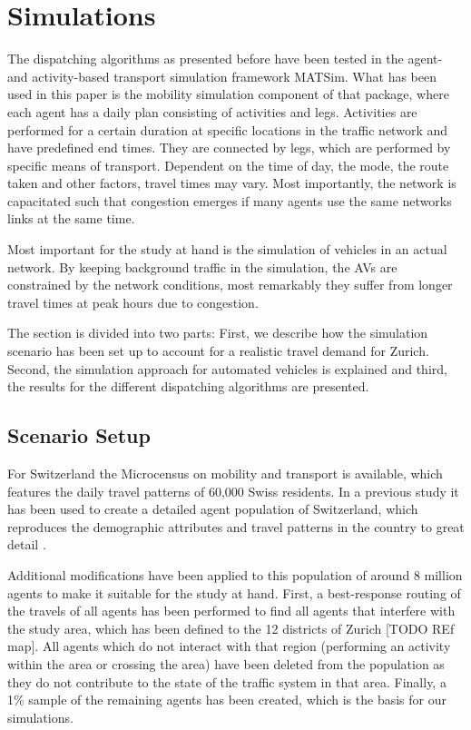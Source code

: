 \section{Simulations}
\label{sec:staticSimulations}

The dispatching algorithms as presented before have been tested in the agent- and activity-based transport simulation framework MATSim. What has been used in this paper is the mobility simulation component of that package, where each agent has a daily plan consisting of activities and legs. Activities are performed for a certain duration at specific locations in the traffic network and have predefined end times. They are connected by legs, which are performed by specific means of transport. Dependent on the time of day, the mode, the route taken and other factors, travel times may vary. Most importantly, the network is capacitated such that congestion emerges if many agents use the same networks links at the same time.

Most important for the study at hand is the simulation of vehicles in an actual network. By keeping background traffic in the simulation, the AVs are constrained by the network conditions, most remarkably they suffer from longer travel times at peak hours due to congestion.

The section is divided into two parts: First, we describe how the simulation scenario has been set up to account for a realistic travel demand for Zurich. Second, the simulation approach for automated vehicles is explained and third, the results for the different dispatching algorithms are presented.

\subsection{Scenario Setup}
\label{sec:simulations_scenario}

For Switzerland the Microcensus on mobility and transport \cite{microcensus} is available, which features the daily travel patterns of 60,000 Swiss residents. In a previous study it has been used to create a detailed agent population of Switzerland, which reproduces the demographic attributes and travel patterns in the country to great detail \cite{ivtbaseline}.

Additional modifications have been applied to this population of around 8 million agents to make it suitable for the study at hand. First, a best-response routing of the travels of all agents has been performed to find all agents that interfere with the study area, which has been defined to the 12 districts of Zurich [TODO REf map]. All agents which do not interact with that region (performing an activity within the area or crossing the area) have been deleted from the population as they do not contribute to the state of the traffic system in that area. Finally, a 1\% sample of the remaining agents has been created, which is the basis for our simulations.

